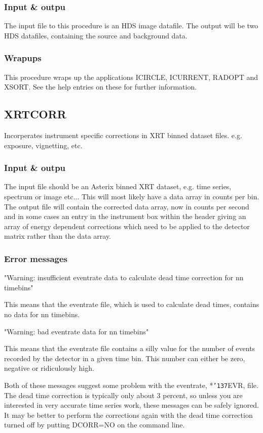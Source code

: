 \documentclass{book}
\renewcommand{\_}{{\tt\char'137}}     %
\begin{document}
\subsubsection{Input \& outpu}
The input file to this procedure is an HDS image datafile. The output
will be two HDS datafiles, containing the source and background data.

\subsubsection{Wrapups}
This procedure wraps up the applications ICIRCLE, ICURRENT, RADOPT and XSORT.
See the help entries on these for further information.
\subsection{XRTCORR}
Incorperates instrument specific corrections in XRT binned dataset files.
e.g. exposure, vignetting, etc.

\subsubsection{Input \& outpu}
The input file should be an Asterix binned XRT dataset, e.g. time series,
spectrum or image etc... This will most likely have a data array in counts
per bin. The output file will contain the corrected data array, now in
counts per second and in some cases an entry in the instrument box
within the header giving an array of energy dependent corrections which
need to be applied to the detector matrix rather than the data array.

\subsubsection{Error messages}
"Warning: insufficient eventrate data to calculate dead time correction
for nn timebins"

This means that the eventrate file, which is used to calculate dead times,
contains no data for nn timebins.

"Warning: bad eventrate data for nn timebins"

This means that the eventrate file contains a silly value for the
number of events recorded by the detector in a given time bin. This
number can either be zero, negative or ridiculously high.

Both of these messages suggest some problem with the eventrate, *\_EVR,
file. The dead time correction is typically only about 3 percent, so
unless you are interested in very accurate time series work, these messages
can be safely ignored. It may be better to perform the corrections again
with the dead time correction turned off by putting DCORR=NO on the
command line.
\end{document}

